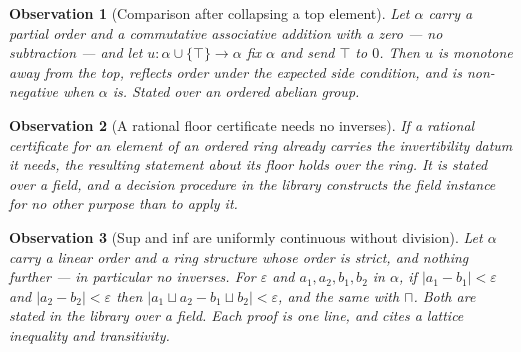 \documentclass[11pt]{article}
\newtheorem{observation}{Observation}
\begin{document}
\begin{observation}[Comparison after collapsing a top element]\label{obs:withtop}
Let $\alpha$ carry a partial order and a commutative associative addition with
a zero --- no subtraction ---
and let $u \colon \alpha \cup \{\top\} \to \alpha$ fix $\alpha$ and send $\top$
to $0$. Then $u$ is monotone away from the top, reflects order under the
expected side condition, and is non-negative when $\alpha$ is. Stated over an
ordered abelian group.
\end{observation}

\begin{observation}[A rational floor certificate needs no inverses]
If a rational certificate for an element of an ordered ring already carries the
invertibility datum it needs, the resulting statement about its floor holds over
the ring. It is stated over a field, and a decision procedure in the library
constructs the field instance for no other purpose than to apply it.
\end{observation}

\begin{observation}[Sup and inf are uniformly continuous without division]
Let $\alpha$ carry a linear order and a ring structure whose order is strict,
and nothing further --- in particular no inverses. For $\varepsilon$ and
$a_1,a_2,b_1,b_2$ in $\alpha$, if $\lvert a_1-b_1\rvert<\varepsilon$ and
$\lvert a_2-b_2\rvert<\varepsilon$ then
$\lvert a_1\sqcup a_2-b_1\sqcup b_2\rvert<\varepsilon$, and the same with
$\sqcap$. Both are stated in the library over a field. Each proof is one line,
and cites a lattice inequality and transitivity.
\end{observation}
\end{document}

